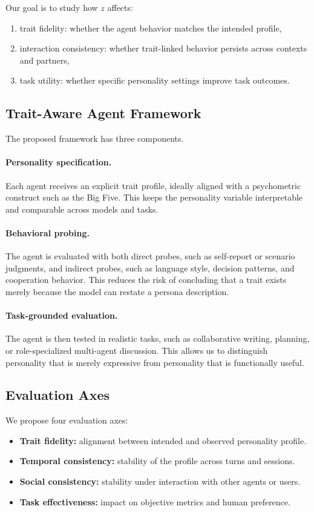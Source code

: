 \documentclass[11pt]{article}
\begin{document}
Our goal is to study how $z$ affects:
\begin{enumerate}
    \item trait fidelity: whether the agent behavior matches the intended profile,
    \item interaction consistency: whether trait-linked behavior persists across contexts and partners,
    \item task utility: whether specific personality settings improve task outcomes.
\end{enumerate}

\subsection{Trait-Aware Agent Framework}
The proposed framework has three components.

\paragraph{Personality specification.}
Each agent receives an explicit trait profile, ideally aligned with a psychometric construct such as the Big Five. This keeps the personality variable interpretable and comparable across models and tasks.

\paragraph{Behavioral probing.}
The agent is evaluated with both direct probes, such as self-report or scenario judgments, and indirect probes, such as language style, decision patterns, and cooperation behavior. This reduces the risk of concluding that a trait exists merely because the model can restate a persona description.

\paragraph{Task-grounded evaluation.}
The agent is then tested in realistic tasks, such as collaborative writing, planning, or role-specialized multi-agent discussion. This allows us to distinguish personality that is merely expressive from personality that is functionally useful.

\subsection{Evaluation Axes}
We propose four evaluation axes:
\begin{itemize}
    \item \textbf{Trait fidelity:} alignment between intended and observed personality profile.
    \item \textbf{Temporal consistency:} stability of the profile across turns and sessions.
    \item \textbf{Social consistency:} stability under interaction with other agents or users.
    \item \textbf{Task effectiveness:} impact on objective metrics and human preference.
\end{itemize}
\end{document}
